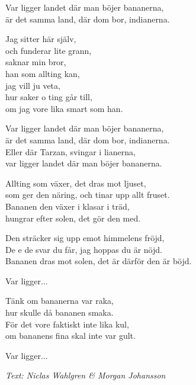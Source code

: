 \vspace{8pt}
{Var ligger landet där man böjer bananerna,\\
är det samma land, där dom bor, indianerna.\par
\vspace{7pt}
Jag sitter här själv,\\
och funderar lite grann,\\
saknar min bror,\\
han som allting kan,\\
jag vill ju veta,\\
hur saker o ting går till,\\
om jag vore lika smart som han.\par
\vspace{7pt}
Var ligger landet där man böjer bananerna,\\
är det samma land, där dom bor, indianerna.\\
Eller där Tarzan, svingar i lianerna,\\
var ligger landet där man böjer bananerna.\par
\vspace{7pt}
Allting som växer, det dras mot ljuset,\\
som ger den näring, och tinar upp allt fruset.\\
Bananen den växer i klasar i träd,\\
hungrar efter solen, det gör den med.\par
\vspace{7pt}
Den sträcker sig upp emot himmelens fröjd,\\
De e de svar du får, jag hoppas du är nöjd.\\
Bananen dras mot solen, det är därför den är böjd.\par
\vspace{7pt}
Var ligger...\par
\vspace{7pt}
Tänk om bananerna var raka,\\
hur skulle då bananen smaka.\\
För det vore faktiskt inte lika kul,\\
om bananens fina skal inte var gult.\par
\vspace{7pt}
Var ligger...}\par
\vspace{8pt}
{\footnotesize\textit{Text: Niclas Wahlgren \& Morgan Johansson}}
